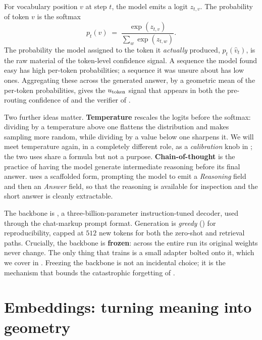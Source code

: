 \begin{precise}
For vocabulary position $v$ at step $t$, the model emits a logit $z_{t,v}$. The
probability of token $v$ is the softmax
\[
  p_t(v) \;=\; \frac{\exp(z_{t,v})}{\sum_{w}\exp(z_{t,w})}.
\]
The probability the model assigned to the token it \emph{actually} produced,
$p_t(\hat v_t)$, is the raw material of the token-level confidence signal. A
sequence the model found easy has high per-token probabilities; a sequence it was
unsure about has low ones. Aggregating these across the generated answer, by a
geometric mean of the per-token probabilities, gives the $u_{\text{token}}$ signal that
appears in both the pre-routing confidence of  and the verifier of
.
\end{precise}

Two further ideas matter. \textbf{Temperature} rescales the logits before the
softmax: dividing by a temperature above one flattens the distribution and makes
sampling more random, while dividing by a value below one sharpens it. We will
meet temperature again, in a completely different role, as a \emph{calibration}
knob in ; the two uses share a formula but not a
purpose. \textbf{Chain-of-thought} is the practice of having the model generate
intermediate reasoning before its final answer. \caem{} uses a scaffolded form,
prompting the model to emit a \emph{Reasoning} field and then an \emph{Answer}
field, so that the reasoning is available for inspection and the short answer is
cleanly extractable.

\begin{fromcode}
The backbone is , a three-billion-parameter
instruction-tuned decoder, used through the chat-markup prompt format. Generation
is \emph{greedy} () for reproducibility, capped at $512$
new tokens for both the zero-shot and retrieval paths. Crucially, the backbone is
\textbf{frozen}: across the entire run its original weights never change. The only
thing that trains is a small adapter bolted onto it, which we cover in
. Freezing the backbone is not an incidental choice; it is
the mechanism that bounds the catastrophic forgetting of .
\end{fromcode}

\section{Embeddings: turning meaning into geometry}
\label{sec:prereq-embeddings}

